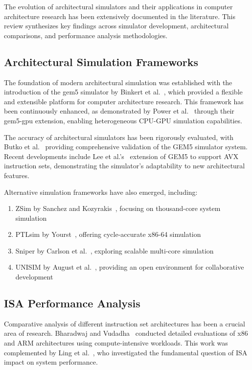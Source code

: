 The evolution of architectural simulators and their applications in computer architecture research has been extensively documented in the literature. This review synthesizes key findings across simulator development, architectural comparisons, and performance analysis methodologies.

\subsection{Architectural Simulation Frameworks}

The foundation of modern architectural simulation was established with the introduction of the gem5 simulator by Binkert et al.~\cite{binkert2011gem5}, which provided a flexible and extensible platform for computer architecture research. This framework has been continuously enhanced, as demonstrated by Power et al.~\cite{power2015gem5gpu} through their gem5-gpu extension, enabling heterogeneous CPU-GPU simulation capabilities.

The accuracy of architectural simulators has been rigorously evaluated, with Butko et al.~\cite{butko2012accuracy} providing comprehensive validation of the GEM5 simulator system. Recent developments include Lee et al.'s~\cite{lee2024gem5} extension of GEM5 to support AVX instruction sets, demonstrating the simulator's adaptability to new architectural features.

Alternative simulation frameworks have also emerged, including:
\begin{enumerate}
    \item ZSim by Sanchez and Kozyrakis~\cite{sanchez2013zsim}, focusing on thousand-core system simulation
    \item PTLsim by Yourst~\cite{yourst2007ptlsim}, offering cycle-accurate x86-64 simulation
    \item Sniper by Carlson et al.~\cite{carlson2011sniper}, exploring scalable multi-core simulation
    \item UNISIM by August et al.~\cite{august2007unisim}, providing an open environment for collaborative development
\end{enumerate}

\subsection{ISA Performance Analysis}

Comparative analysis of different instruction set architectures has been a crucial area of research. Bharadwaj and Vudadha~\cite{bharadwaj2022evaluation} conducted detailed evaluations of x86 and ARM architectures using compute-intensive workloads. This work was complemented by Ling et al.~\cite{ling2019isa}, who investigated the fundamental question of ISA impact on system performance.

